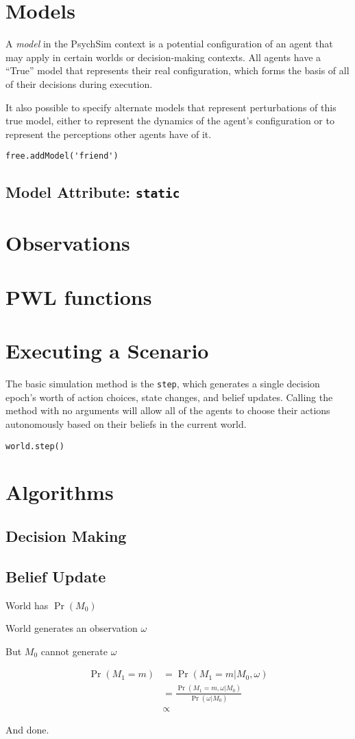 \documentclass{article}
\begin{document}
\section{Models}

A {\em model} in the PsychSim context is a potential configuration of an agent that may apply in certain worlds or decision-making contexts. All agents have a ``True'' model that represents their real configuration, which forms the basis of all of their decisions during execution. 


It also possible to specify alternate models that represent perturbations of this true model, either to represent the dynamics of the agent's configuration or to represent the perceptions other agents have of it.

\begin{verbatim}
free.addModel('friend')
\end{verbatim}

\subsection{Model Attribute: {\tt static}}

\section{Observations}

\section{PWL functions}\label{sec:pwl}

\section{Executing a Scenario}

The basic simulation method is the {\tt step}, which generates a single decision epoch's worth of action choices, state changes, and belief updates. Calling the method with no arguments will allow all of the agents to choose their actions autonomously based on their beliefs in the current world.

\begin{verbatim}
world.step()
\end{verbatim}

\section{Algorithms}

\subsection{Decision Making}

\subsection{Belief Update}

World has $\Pr(M_0)$

World generates an observation $\omega$

But $M_0$ cannot generate $\omega$

\begin{align}
\Pr(M_1=m)&=\Pr(M_1=m|M_0,\omega)\\
&=\frac{\Pr(M_1=m,\omega|M_0)}{\Pr(\omega|M_0)}\\
&\propto 
\end{align}

And done.
\end{document}
